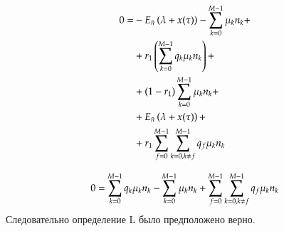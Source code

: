 \begin{equation}\begin{aligned}
    0 = 
    &-E_{\bar{n}}\left( {\lambda + x(\tau)} \right) - \sum_{{k}=0}^{M-1}\mu_{k}{n}_{k} + \\
    &+r_1 \left( {\sum_{{k}=0}^{M-1} q_{k}\mu_{k}{n}_{k}} \right) + \\
    &+\left( {1-r_1} \right) \sum_{k=0}^{M-1}\mu_k n_k + \\
    &+E_{\bar{n}}\left( {\lambda + x(\tau)} \right) + \\
    &+r_1 \sum_{{f}=0}^{M-1} \sum_{{k}=0, {k} \neq {f}}^{M-1} q_f \mu_k n_k 
\end{aligned}\end{equation}

\begin{equation}
    0 =
    \sum_{{k}=0}^{M-1} q_{k}\mu_{k}{n}_{k} 
    -\sum_{k=0}^{M-1}\mu_k n_k 
    +\sum_{{f}=0}^{M-1} \sum_{{k}=0, {k} \neq {f}}^{M-1} q_f \mu_k n_k 
\end{equation}
Следовательно определение L было предположено верно.

